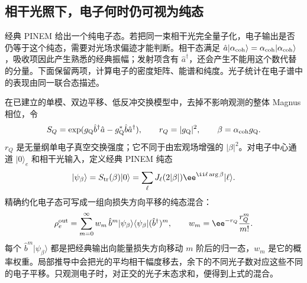 \subsection{相干光照下，电子何时仍可视为纯态}
\label{sec:electron-quantum-exchange-coherence}

经典 PINEM 给出一个纯电子态。若把同一束相干光完全量子化，电子输出是否仍等于这个纯态，需要对光场求偏迹才能判断。相干态满足 $\hat a|\alpha_{\rm coh}\rangle=\alpha_{\rm coh}|\alpha_{\rm coh}\rangle$，吸收项因此产生熟悉的经典振幅；发射项含有 $\hat a^\dagger$，还会产生不能用这个数代替的分量。下面保留两项，计算电子的密度矩阵、能谱和纯度。光子统计在电子谱中的表现由同一联合态描述。\cite{Dahan2021Science}

在已建立的单模、双边平移、低反冲交换模型中，去掉不影响观测的整体 Magnus 相位，令
\begin{equation*}
 S_Q=\exp(g_{\mathrm Q}\hat b^\dagger\hat a-g_{\mathrm Q}^*\hat b\hat a^\dagger),
 \qquad r_Q=|g_{\mathrm Q}|^2,\qquad \beta=\alpha_{\rm coh}g_{\mathrm Q}.
\end{equation*}
$r_Q$ 是无量纲单电子真空交换强度；它不同于由宏观场增强的 $|\beta|^2$。对电子中心通道 $|0\rangle_e$ 和相干光输入，定义经典 PINEM 纯态
\begin{equation*}
 |\psi_\beta\rangle=S_{\rm tr}(\beta)|0\rangle
 =\sum_\ell J_\ell(2|\beta|)\ee^{\ii\ell\arg\beta}|\ell\rangle.
\end{equation*}
精确约化电子态可写成一组向损失方向平移的纯态混合：
\begin{equation}
 \rho_e^{\rm out}=\sum_{m=0}^{\infty}w_m\,
 \hat b^m|\psi_\beta\rangle\langle\psi_\beta|(\hat b^\dagger)^m,
 \qquad w_m=\ee^{-r_Q}\frac{r_Q^m}{m!}.
 \label{eq:electron-coherent-light-reduced-state}
\end{equation}
每个 $\hat b^m|\psi_\beta\rangle$ 都是把经典输出向能量损失方向移动 $m$ 阶后的归一态，$w_m$ 是它的概率权重。局部推导中会把光的平均相干幅度移去，余下的不同光子数对应这些不同的电子平移。只观测电子时，对正交的光子末态求和，便得到上式的混合。

